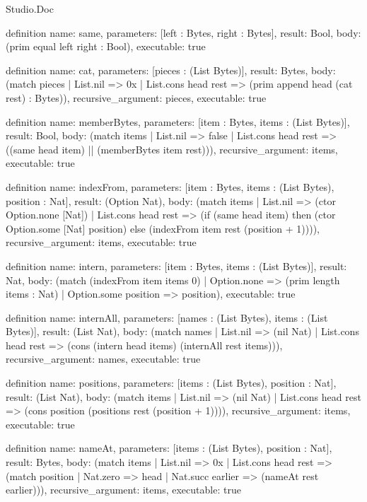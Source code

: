 \begin{lexlean}{Studio.Doc}
\begin{semanticmodule}
definition{
  name: same,
  parameters: [left : Bytes, right : Bytes],
  result: Bool,
  body: (prim equal left right : Bool),
  executable: true
}

definition{
  name: cat,
  parameters: [pieces : (List Bytes)],
  result: Bytes,
  body: (match pieces
    | List.nil => 0x
    | List.cons head rest => (prim append head (cat rest) : Bytes)),
  recursive_argument: pieces,
  executable: true
}

definition{
  name: memberBytes,
  parameters: [item : Bytes, items : (List Bytes)],
  result: Bool,
  body: (match items
    | List.nil => false
    | List.cons head rest => ((same head item) || (memberBytes item rest))),
  recursive_argument: items,
  executable: true
}

definition{
  name: indexFrom,
  parameters: [item : Bytes, items : (List Bytes), position : Nat],
  result: (Option Nat),
  body: (match items
    | List.nil => (ctor Option.none [Nat])
    | List.cons head rest => (if (same head item) then (ctor Option.some [Nat] position) else (indexFrom item rest (position + 1)))),
  recursive_argument: items,
  executable: true
}

definition{
  name: intern,
  parameters: [item : Bytes, items : (List Bytes)],
  result: Nat,
  body: (match (indexFrom item items 0)
    | Option.none => (prim length items : Nat)
    | Option.some position => position),
  executable: true
}

definition{
  name: internAll,
  parameters: [names : (List Bytes), items : (List Bytes)],
  result: (List Nat),
  body: (match names
    | List.nil => (nil Nat)
    | List.cons head rest => (cons (intern head items) (internAll rest items))),
  recursive_argument: names,
  executable: true
}

definition{
  name: positions,
  parameters: [items : (List Bytes), position : Nat],
  result: (List Nat),
  body: (match items
    | List.nil => (nil Nat)
    | List.cons head rest => (cons position (positions rest (position + 1)))),
  recursive_argument: items,
  executable: true
}

definition{
  name: nameAt,
  parameters: [items : (List Bytes), position : Nat],
  result: Bytes,
  body: (match items
    | List.nil => 0x
    | List.cons head rest => (match position
      | Nat.zero => head
      | Nat.succ earlier => (nameAt rest earlier))),
  recursive_argument: items,
  executable: true
}


\end{semanticmodule}
\end{lexlean}

